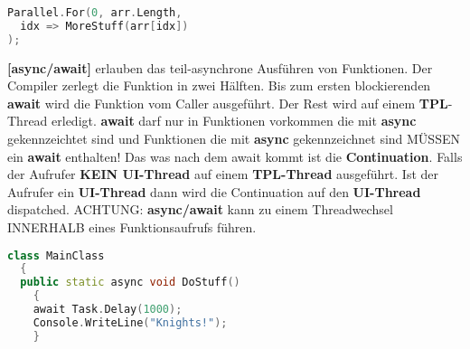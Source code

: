 \documentclass[8pt]{extarticle}
\let\oldtextbf\textbf
\renewcommand{\textbf}{\tiny\oldtextbf}
\begin{document}
\begin{multicols*}{5}
\begin{lstlisting}[language=c++]
Parallel.For(0, arr.Length,
  idx => MoreStuff(arr[idx])
);
\end{lstlisting}
\textbf{[async/await]} erlauben das teil-asynchrone Ausführen von Funktionen. Der Compiler zerlegt die Funktion in zwei Hälften. Bis zum ersten blockierenden \textbf{await} wird die Funktion vom Caller ausgeführt. Der Rest wird auf einem \textbf{TPL}-Thread erledigt. \textbf{await} darf nur in Funktionen vorkommen die mit \textbf{async} gekennzeichtet sind und Funktionen die mit \textbf{async} gekennzeichnet sind MÜSSEN ein \textbf{await} enthalten! Das was nach dem await kommt ist die \textbf{Continuation}. Falls der Aufrufer \textbf{KEIN UI-Thread} auf einem \textbf{TPL-Thread} ausgeführt. Ist der Aufrufer ein \textbf{UI-Thread} dann wird die Continuation auf den \textbf{UI-Thread} dispatched. ACHTUNG: \textbf{async/await} kann zu einem Threadwechsel INNERHALB eines Funktionsaufrufs führen.
\begin{lstlisting}[language=c++]
class MainClass
  {
  public static async void DoStuff()
    {
    await Task.Delay(1000);
    Console.WriteLine("Knights!");
    }


\end{lstlisting}
\end{multicols*}
\end{document}
